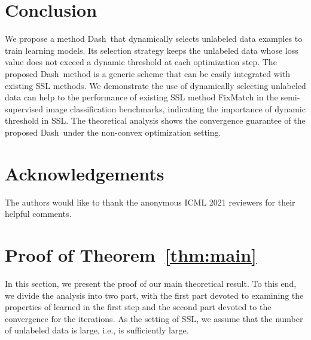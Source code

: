 \documentclass{article}
\def \Alg {Dash}
\begin{document}
\section{Conclusion}
We propose a method \Alg~that dynamically selects unlabeled data examples to train learning models. Its selection strategy keeps the unlabeled data whose loss value does not exceed a dynamic threshold at each optimization step. The proposed \Alg~method is a generic scheme that can be easily integrated with existing SSL methods. We demonstrate the use of dynamically selecting unlabeled data can help to the performance of existing SSL method FixMatch in the semi-supervised image classification benchmarks, indicating the importance of dynamic threshold in SSL. The theoretical analysis shows the convergence guarantee of the proposed \Alg~under the non-convex optimization setting. 



\section*{Acknowledgements}
The authors would like to thank the anonymous ICML 2021 reviewers for their helpful comments. 

 



\newpage
\appendix
\section{Proof of Theorem~\ref{thm:main}}\label{sec:proof}
In this section, we present the proof of our main theoretical result. To this end, we divide the analysis into two part, with the first part devoted to examining the properties of  learned in the first step and the second part devoted to the convergence for the iterations. As the setting of SSL, we assume that the number of unlabeled data is large, i.e.,  is sufficiently large. 
\end{document}
